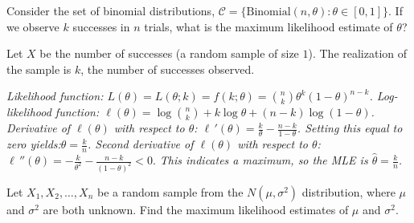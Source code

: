 

\begin{example}\label{ex:mlebinomial}
Consider the set of binomial distributions, $\mathcal{C} = \{\text{Binomial}(n,\theta):\theta\in[0,1]\}$. 
If we observe $k$ successes in $n$ trials, what is the maximum likelihood estimate of $\theta$?
\end{example}
\begin{solution}
Let $X$ be the number of successes (a random sample of size $1$). The realization of the sample is $k$, the number of successes observed. 

\bit
\it
Likelihood function:\quad
$\displaystyle L(\theta) = L(\theta; k) = f(k;\theta) = \binom{n}{k}\theta^k(1-\theta)^{n-k}$.
\it 
Log-likelihood function:\quad
$\displaystyle\ell(\theta) = \log \binom{n}{k} + k\log\theta + (n-k)\log(1-\theta)$.
\it
Derivative of $\ell(\theta)$ with respect to $\theta$:\quad
$\displaystyle\ell\,'(\theta)= \frac{k}{\theta} - \frac{n-k}{1-\theta}$.
\it
Setting this equal to zero yields:\quad $\displaystyle\theta = \frac{k}{n}$.
\it
Second derivative of $\ell(\theta)$ with respect to $\theta$:\quad $\displaystyle\ell\,''(\theta) = -\frac{k}{\theta^2} - \frac{n-k}{(1-\theta)^2}< 0.$
\it
This indicates a maximum, so the MLE is $\displaystyle\hat{\theta} = \frac{k}{n}$.
\eit
\end{solution}


\begin{example}\label{ex:mlenormal}
Let $X_1,X_2,\ldots,X_n$ be a random sample from the $N(\mu,\sigma^2)$ distribution, where $\mu$ and $\sigma^2$ are both unknown. Find the maximum likelihood estimates of $\mu$ and $\sigma^2$.
\end{example}

